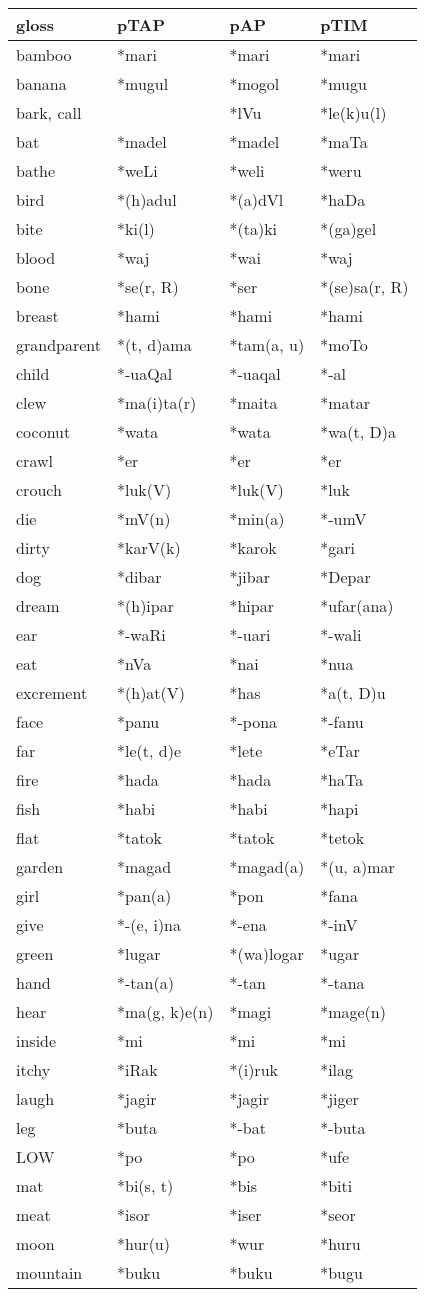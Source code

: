 \begin{table}\centering\small


\begin{tabular}{llll}
\hline
{\bfseries gloss}&{\bfseries pTAP}&{\bfseries pAP}&{\bfseries pTIM}\\\hline
bamboo&*mari&*mari&*mari\\
banana&*mugul&*mogol&*mugu\\
bark, call&&*lVu&*le(k)u(l)\\
bat&*madel&*madel&*maTa\\
bathe&*weLi&*weli&*weru\\
bird&*(h)adul&*(a)dVl&*haDa\\
bite&*ki(l)&*(ta)ki&*(ga)gel\\
blood&*waj&*wai&*waj\\
bone&*se(r, R)&*ser&*(se)sa(r, R)\\
breast&*hami&*hami&*hami\\
grandparent&*(t, d)ama&*tam(a, u)&*moTo\\
child&*-uaQal&*-uaqal&*-al\\
clew&*ma(i)ta(r)&*maita&*matar\\
coconut&*wata&*wata&*wa(t, D)a\\
crawl&*er&*er&*er\\
crouch&*luk(V)&*luk(V)&*luk\\
die&*mV(n)&*min(a)&*-umV\\
dirty&*karV(k)&*karok&*gari\\
dog&*dibar&*jibar&*Depar\\
dream&*(h)ipar&*hipar&*ufar(ana)\\
ear&*-waRi&*-uari&*-wali\\
eat&*nVa&*nai&*nua\\
excrement&*(h)at(V)&*has&*a(t, D)u\\
face&*panu&*-pona&*-fanu\\
far&*le(t, d)e&*lete&*eTar\\
fire&*hada&*hada&*haTa\\
fish&*habi&*habi&*hapi\\
flat&*tatok&*tatok&*tetok\\
garden&*magad&*magad(a)&*(u, a)mar\\
girl&*pan(a)&*pon&*fana\\
give&*-(e, i)na&*-ena&*-inV\\
green&*lugar&*(wa)logar&*ugar\\
hand&*-tan(a)&*-tan&*-tana\\
hear&*ma(g, k)e(n)&*magi&*mage(n)\\
inside&*mi&*mi&*mi\\
itchy&*iRak&*(i)ruk&*ilag\\
laugh&*jagir&*jagir&*jiger\\
leg&*buta&*-bat&*-buta\\
LOW&*po&*po&*ufe\\
mat&*bi(s, t)&*bis&*biti\\
meat&*isor&*iser&*seor\\
moon&*hur(u)&*wur&*huru\\
mountain&*buku&*buku&*bugu\\
\end{tabular}



\end{table}
